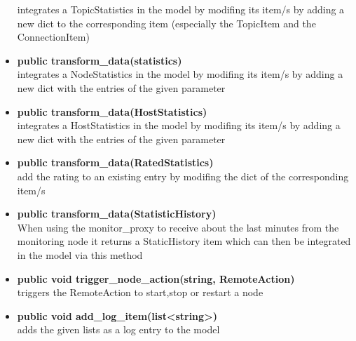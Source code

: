 \begin{itemize}
  integrates a TopicStatistics in the model by modifing its item/s by adding a new dict to the corresponding item (especially the TopicItem and the ConnectionItem)
  \item \textbf{public transform\_data(statistics)}\\ 
  integrates a NodeStatistics in the model by modifing its item/s by adding a new dict with the entries of the given parameter
  \item \textbf{public transform\_data(HostStatistics)}\\ 
  integrates a HostStatistics in the model by modifing its item/s by adding a new dict with the entries of the given parameter
  \item \textbf{public transform\_data(RatedStatistics)}\\ 
  add the rating to an existing entry by modifing the dict of the corresponding
  item/s
  \item \textbf{public transform\_data(StatisticHistory)}\\ 
  When using the monitor\_proxy to receive about the last minutes from the monitoring node
  it returns a StaticHistory item which can then be integrated in the model via this method
  \item \textbf{public void trigger\_node\_action(string, RemoteAction)}\\
  triggers the RemoteAction to start,stop or restart a node
  \item\textbf{public void add\_log\_item(list<string>)}\\
  adds the given lists as a log entry to the model
  \end{itemize}


